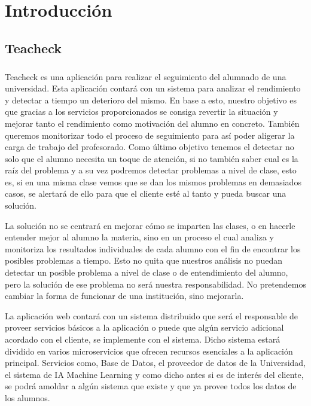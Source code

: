 \chapter{Introducción}
\section{Teacheck}
\paragraph{}
Teacheck es una aplicación para realizar el seguimiento del alumnado de una universidad.
Esta aplicación contará con un sistema para analizar el rendimiento y detectar a tiempo un deterioro del mismo. En base a esto, nuestro objetivo es que gracias a los servicios proporcionados se consiga revertir la situación y mejorar tanto el rendimiento como motivación del alumno en concreto. También queremos monitorizar todo el proceso de seguimiento para así poder aligerar la carga de trabajo del profesorado. Como último objetivo tenemos el detectar no solo que el alumno necesita un toque de atención, si no también saber cual es la raíz del problema y a su vez podremos detectar problemas a nivel de clase, esto es, si en una misma clase vemos que se dan los mismos problemas en demasiados casos, se alertará de ello para que el cliente esté al tanto y pueda buscar una solución.

La solución no se centrará en mejorar cómo se imparten las clases, o en hacerle entender mejor al alumno la materia, sino en un proceso el cual analiza y monitoriza los resultados individuales de cada alumno con el fin de encontrar los posibles problemas a tiempo. Esto no quita que nuestros análisis no puedan detectar un posible problema a nivel de clase o de entendimiento del alumno, pero la solución de ese problema no será nuestra responsabilidad. No pretendemos cambiar la forma de funcionar de una institución, sino mejorarla.

La aplicación web contará con un sistema distribuido que será el responsable de proveer servicios básicos a la aplicación o puede que algún servicio adicional acordado con el cliente, se implemente con el sistema. Dicho sistema estará dividido en varios microservicios que ofrecen recursos esenciales a la aplicación principal. Servicios como, Base de Datos, el proveedor de datos de la Universidad, el sistema de IA Machine Learning y como dicho antes si es de interés del cliente, se podrá amoldar a algún sistema que existe y que ya provee todos los datos de los alumnos.

